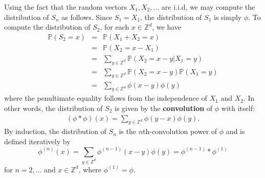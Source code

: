 \documentclass[11pt, letter]{book}
\begin{document}
\noindent Using the fact that the random vectors $X_1,X_2,\dots$ are i.i.d, we may compute the distribution of $S_n$ as follows. Since $S_1 = X_1$, the distribution of $S_1$ is simply $\phi$. To compute the distribution of $S_2$, for each $x\in\mathbb{Z}^d$, we have
\begin{eqnarray*}
    \mathbb{P}(S_2=x)
    &=&\mathbb{P}(X_1+X_2=x)\\
    &=&\mathbb{P}(X_2=x-X_1)\\
    &=& \sum_{y\in\mathbb{Z}^d} \mathbb{P}(X_2 = x-y|X_1=y)\\
    &=& \sum_{y\in\mathbb{Z}^d} \mathbb{P}(X_2 = x-y)\mathbb{P}(X_1 = y)\\
    &=&\sum_{y\in\mathbb{Z}^d}\phi(x-y)\phi(y)
\end{eqnarray*}
where the penultimate equality follows from the independence of $X_1$ and $X_2$. In other words, the distribution of $S_2$ is given by the \textbf{convolution} of $\phi$ with itself:
\begin{align*}
    (\phi \ast \phi)(x) = \sum_{y\in \mathbb{Z}^d} \phi(y-x) \phi(y).
\end{align*}
By induction, the distribution of $S_n$ is the $n$th-convolution power of $\phi$ and is defined iteratively by
\begin{equation*}
    \phi^{(n)}(x)=\sum_{y\in\mathbb{Z}^d}\phi^{(n-1)}(x-y)\phi(y) = \phi^{(n-1)}\ast \phi^{(1)}
\end{equation*}
for $n=2,\dots$ and $x\in\mathbb{Z}^d$, where $\phi^{(1)} = \phi$. 
\end{document}
